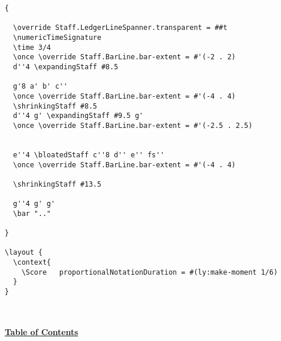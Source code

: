 \begin{verbatim}
{

  \override Staff.LedgerLineSpanner.transparent = ##t
  \numericTimeSignature
  \time 3/4
  \once \override Staff.BarLine.bar-extent = #'(-2 . 2)
  d''4 \expandingStaff #8.5

  g'8 a' b' c''
  \once \override Staff.BarLine.bar-extent = #'(-4 . 4)
  \shrinkingStaff #8.5
  d''4 g' \expandingStaff #9.5 g'
  \once \override Staff.BarLine.bar-extent = #'(-2.5 . 2.5)


  e''4 \bloatedStaff c''8 d'' e'' fs'' 
  \once \override Staff.BarLine.bar-extent = #'(-4 . 4)

  \shrinkingStaff #13.5

  g''4 g' g'
  \bar ".."

}

\layout {
  \context{
    \Score   proportionalNotationDuration = #(ly:make-moment 1/6)
  }
}


\end{verbatim}
\hyperref[sec:toc]{\\ \textbf{Table of Contents}}

\vfill \break


